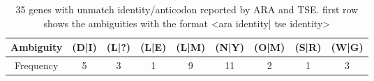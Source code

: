 \documentclass[table,
12pt, %
a4paper, %
oneside, %
headinclude,footinclude, %
BCOR5mm, %
]{scrartcl}
\begin{document}
\begin{table}[hbt]
  \caption{35 genes with unmatch identity/anticodon reported by ARA and TSE. first row shows the ambiguities with the format <ara identity| tse identity>}
  \begin{adjustbox}{scale=0.9,center}
    \begin{tabular}{|c|cccccccc|}
      \hline
      \rowcolor{shadecolor}
      Ambiguity & (D|I) & (L|?) & (L|E) & (L|M) & (N|Y) & (O|M) & (S|R) & (W|G) \\
      \hline
      Frequency & 5     & 3     & 1     & 9     & 11    & 2     & 1     & 3     \\
      \hline
    \end{tabular}
    \label{table:undet1}
  \end{adjustbox}
\end{table}
\end{document}
